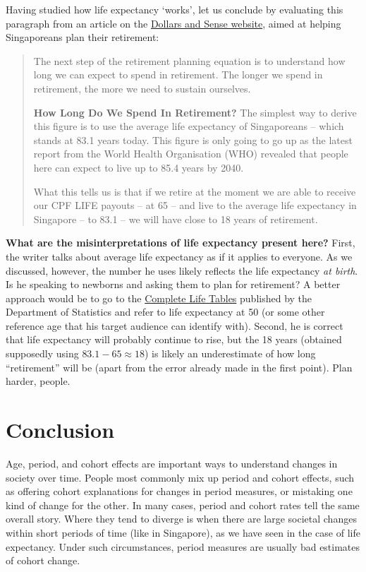 \documentclass[openany]{book}
\begin{document}
Having studied how life expectancy `works', let us conclude by
evaluating this paragraph from an article on the
\href{https://dollarsandsense.sg/retirement-planning-singapore-live-beyond-average-life-expectancy/}{Dollars
and Sense website}, aimed at helping Singaporeans plan their retirement:

\begin{quote}
The next step of the retirement planning equation is to understand how
long we can expect to spend in retirement. The longer we spend in
retirement, the more we need to sustain ourselves.

\textbf{How Long Do We Spend In Retirement?} The simplest way to derive
this figure is to use the average life expectancy of Singaporeans --
which stands at 83.1 years today. This figure is only going to go up as
the latest report from the World Health Organisation (WHO) revealed that
people here can expect to live up to 85.4 years by 2040.

What this tells us is that if we retire at the moment we are able to
receive our CPF LIFE payouts -- at 65 -- and live to the average life
expectancy in Singapore -- to 83.1 -- we will have close to 18 years of
retirement.
\end{quote}

\textbf{What are the misinterpretations of life expectancy present
here?} First, the writer talks about average life expectancy as if it
applies to everyone. As we discussed, however, the number he uses likely
reflects the life expectancy \emph{at birth}. Is he speaking to newborns
and asking them to plan for retirement? A better approach would be to go
to the
\href{https://www.singstat.gov.sg/-/media/files/publications/population/lifetable17-18.pdf}{Complete
Life Tables} published by the Department of Statistics and refer to life
expectancy at 50 (or some other reference age that his target audience
can identify with). Second, he is correct that life expectancy will
probably continue to rise, but the 18 years (obtained supposedly using
\(83.1 - 65 \approx 18\)) is likely an underestimate of how long
``retirement'' will be (apart from the error already made in the first
point). Plan harder, people.

\section{Conclusion}\label{conclusion-3}

Age, period, and cohort effects are important ways to understand changes
in society over time. People most commonly mix up period and cohort
effects, such as offering cohort explanations for changes in period
measures, or mistaking one kind of change for the other. In many cases,
period and cohort rates tell the same overall story. Where they tend to
diverge is when there are large societal changes within short periods of
time (like in Singapore), as we have seen in the case of life
expectancy. Under such circumstances, period measures are usually bad
estimates of cohort change.
\end{document}
